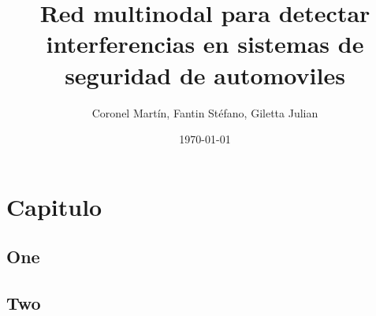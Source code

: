 \documentclass[12pt]{book}
\title{\bf Red multinodal para detectar interferencias en sistemas de seguridad de automoviles}
\author{Coronel Martín, Fantin Stéfano, Giletta Julian}
\date{\today}
\begin{document}
\frontmatter
\maketitle
\tableofcontents

\mainmatter
\section{Capitulo}
\subsection{One}

\subsection{Two}
\end{document}
